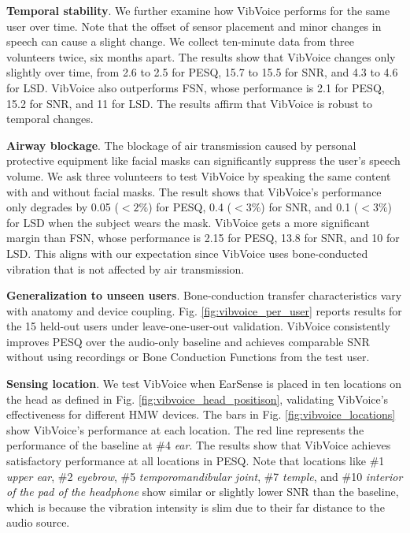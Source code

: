 \noindent\textbf{Temporal stability}.
We further examine how VibVoice performs for the same user over time. Note that the offset of sensor placement and minor changes in speech can cause a slight change. We collect ten-minute data from three volunteers twice, six months apart. 
The results show that VibVoice changes only slightly over time, from 2.6 to 2.5 for PESQ, 15.7 to 15.5 for SNR, and 4.3 to 4.6 for LSD. VibVoice also outperforms FSN, whose performance is 2.1 for PESQ, 15.2 for SNR, and 11 for LSD.
The results affirm that VibVoice is robust to temporal changes.

\noindent\textbf{Airway blockage}.
The blockage of air transmission caused by personal protective equipment like facial masks can significantly suppress the user's speech volume. 
We ask three volunteers to test VibVoice by speaking the same content with and without facial masks.
The result shows that VibVoice's performance only degrades by 0.05 ($< 2\%$) for PESQ, 0.4 ($<3\%$) for SNR, and 0.1 ($<3\%$) for LSD when the subject wears the mask. 
VibVoice gets a more significant margin than FSN, whose performance is  2.15 for PESQ, 13.8 for SNR, and 10 for LSD. 
This aligns with our expectation since VibVoice uses bone-conducted vibration that is not affected by air transmission.

\noindent\textbf{Generalization to unseen users}.
Bone-conduction transfer characteristics vary with anatomy and device coupling. Fig. \ref{fig:vibvoice_per_user} reports results for the 15 held-out users under leave-one-user-out validation. VibVoice consistently improves PESQ over the audio-only baseline and achieves comparable SNR without using recordings or Bone Conduction Functions from the test user.

\noindent\textbf{Sensing location}.
We test VibVoice when EarSense is placed in ten locations on the head as defined in Fig. \ref{fig:vibvoice_head_positison}, validating VibVoice's effectiveness for different HMW devices.
The bars in Fig. \ref{fig:vibvoice_locations} show VibVoice's performance at each location. The red line represents the performance of the baseline at \#4 \emph{ear}. 
The results show that VibVoice achieves satisfactory performance at all locations in PESQ.
Note that locations like \#1 \emph{upper ear}, \#2 \emph{eyebrow}, \#5 \emph{temporomandibular joint}, \#7 \emph{temple}, and \#10 \emph{interior of the pad of the headphone} show similar or slightly lower SNR than the baseline, which is because the vibration intensity is slim due to their far distance to the audio source.

